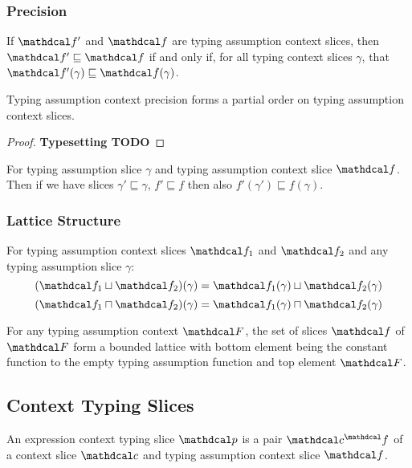 \subsubsection{Precision}
\begin{definition}\label{def:FunctionPrecision}
If $\f'$ and $\f$ are typing assumption context slices, then $\f' \sqsubseteq \f$ if and only if, for all typing context slices $\gamma$, that $\f'(\gamma) \sqsubseteq \f(\gamma)$.
\end{definition}
\begin{proposition}
Typing assumption context precision forms a partial order on typing assumption context slices.
\end{proposition}
\begin{proof}
\textbf{Typesetting TODO}
\end{proof}
\begin{proposition}
For typing assumption slice $\gamma$ and typing assumption context slice $\f$. Then if we have slices $\gamma' \sqsubseteq \gamma$, $f' \sqsubseteq f$ then also $f'(\gamma') \sqsubseteq f(\gamma)$.
\end{proposition}

\subsubsection{Lattice Structure}
\begin{definition} For typing assumption context slices $\f_1$ and $\f_2$ and any typing assumption slice $\gamma$:
\[(\f_1 \sqcup \f_2)(\gamma) = \f_1(\gamma) \sqcup \f_2(\gamma)\]
\[(\f_1 \sqcap \f_2)(\gamma) = \f_1(\gamma) \sqcap \f_2(\gamma)\]
\end{definition}

\begin{conjecture}
For any typing assumption context $\F$, the set of slices $\f$ of $\F$ form a bounded lattice with bottom element being the constant function to the empty typing assumption function and top element $\F$.
\end{conjecture}

\subsection{Context Typing Slices}
\begin{definition}
An expression context typing slice $\p$ is a pair $\Cs^\f$ of a context slice $\Cs$ and typing assumption context slice $\f$.
\end{definition}
